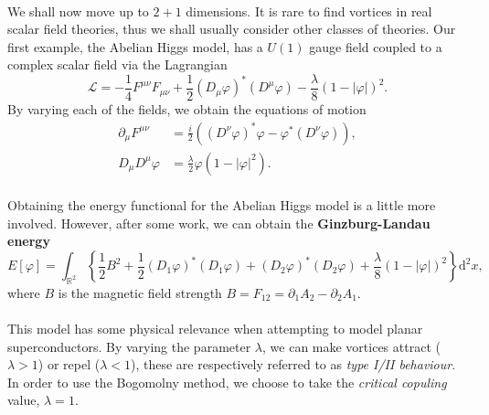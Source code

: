 \documentclass[11pt, fleqn]{article}
\begin{document}
\paragraph{} We shall now move up to $ 2 + 1 $ dimensions. It is rare to find vortices in real scalar field theories, thus we shall usually consider other classes of theories. Our first example, the Abelian Higgs model, has a $ U(1) $ gauge field coupled to a complex scalar field via the Lagrangian
	\begin{equation}\label{key}
		\mathcal{L} = -\frac{1}{4} F^{\mu\nu}F_{\mu\nu} + \frac{1}{2}\left( D_\mu \varphi \right)^* \left( D^\mu \varphi \right) - \frac{\lambda}{8} (1 - |\varphi| )^2.
	\end{equation}
By varying each of the fields, we obtain the equations of motion
	\begin{align}
		\partial_\mu F^{\mu\nu} &= \frac{i}{2} \left( ( D^\nu \varphi)^* \varphi - \varphi^* (D^\nu \varphi) \right),\\
		D_\mu D^\mu \varphi		&= \frac{\lambda}{2} \varphi (1 - |\varphi|^2).
	\end{align}

\paragraph{} Obtaining the energy functional for the Abelian Higgs model is a little more involved. However, after some work, we can obtain the \textbf{Ginzburg-Landau energy}
	\begin{equation}\label{eq:Ginzburg}
		E[\varphi] = \int_{\mathbb{R}^2} \left\{ \frac{1}{2} B^2 + \frac{1}{2} (D_1 \varphi)^*(D_1 \varphi) + (D_2 \varphi)^*(D_2 \varphi) + \frac{\lambda}{8} (1 - |\varphi|)^2 \right\} \mathrm{d}^2x,
	\end{equation}
where $ B $ is the magnetic field strength $ B = F_{12} = \partial_1 A_2 - \partial_2 A_1 $.

\paragraph{} This model has some physical relevance when attempting to model planar superconductors. By varying the parameter $ \lambda $, we can make vortices attract ($ \lambda > 1 $) or repel ($ \lambda < 1 $), these are respectively referred to as \textit{type I/II behaviour}. In order to use the Bogomolny method, we choose to take the \textit{critical copuling} value, $ \lambda = 1 $.
\end{document}
